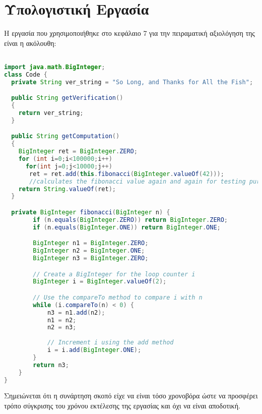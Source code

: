\chapter{Υπολογιστική Εργασία }
Η  εργασία που χρησιμοποιήθηκε στο κεφάλαιο 7 για την πειραματική αξιολόγηση της  είναι η ακόλουθη:


\begin{otherlanguage}{english}

\begin{lstlisting}[language=Java]

import java.math.BigInteger;
class Code {
  private String ver_string = "So Long, and Thanks for All the Fish";

  public String getVerification()
  {
    return ver_string;
  }

  public String getComputation()
  {
    BigInteger ret = BigInteger.ZERO;
    for (int i=0;i<100000;i++)
      for(int j=0;j<10000;j++)
       ret = ret.add(this.fibonacci(BigInteger.valueOf(42))); 
       //calculates the fibonacci value again and again for testing purposes
    return String.valueOf(ret);
  }

  private BigInteger fibonacci(BigInteger n) {
        if (n.equals(BigInteger.ZERO)) return BigInteger.ZERO;
        if (n.equals(BigInteger.ONE)) return BigInteger.ONE;

        BigInteger n1 = BigInteger.ZERO;
        BigInteger n2 = BigInteger.ONE;
        BigInteger n3 = BigInteger.ZERO;

        // Create a BigInteger for the loop counter i
        BigInteger i = BigInteger.valueOf(2);

        // Use the compareTo method to compare i with n
        while (i.compareTo(n) < 0) {
            n3 = n1.add(n2);
            n1 = n2;
            n2 = n3;
            
            // Increment i using the add method
            i = i.add(BigInteger.ONE);
        }
        return n3;
    }
}
\end{lstlisting}
\end{otherlanguage}



Σημειώνεται ότι η συνάρτηση \textit{} σκοπό είχε να είναι τόσο χρονοβόρα ώστε να προσφέρει τρόπο σύγκρισης του χρόνου εκτέλεσης της εργασίας και όχι να είναι αποδοτική.